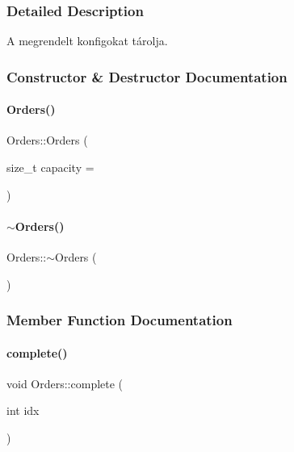 \subsubsection{Detailed Description}
A megrendelt konfigokat tárolja. 

\subsubsection{Constructor \& Destructor Documentation}
\mbox{\label{class_orders_aa52a641a269671bbf68637e0771e8b5d}} 
\paragraph{\texorpdfstring{Orders()}{Orders()}}
{\footnotesize\ttfamily Orders\+::\+Orders (\begin{DoxyParamCaption}\item[{size\+\_\+t}]{capacity = {} }\end{DoxyParamCaption})\hspace{0.3cm}{\ttfamily [inline]}}

\mbox{\label{class_orders_a12bcbd0cd430b51f65f651fddad3f662}} 
\paragraph{\texorpdfstring{$\sim$Orders()}{~Orders()}}
{\footnotesize\ttfamily Orders\+::$\sim$\+Orders (\begin{DoxyParamCaption}{ }\end{DoxyParamCaption})\hspace{0.3cm}{\ttfamily [inline]}}



\subsubsection{Member Function Documentation}
\mbox{\label{class_orders_a6a47de51d6d88328ff6408482f614e8e}} 
\paragraph{\texorpdfstring{complete()}{complete()}}
{\footnotesize\ttfamily void Orders\+::complete (\begin{DoxyParamCaption}\item[{int}]{idx }\end{DoxyParamCaption})}

